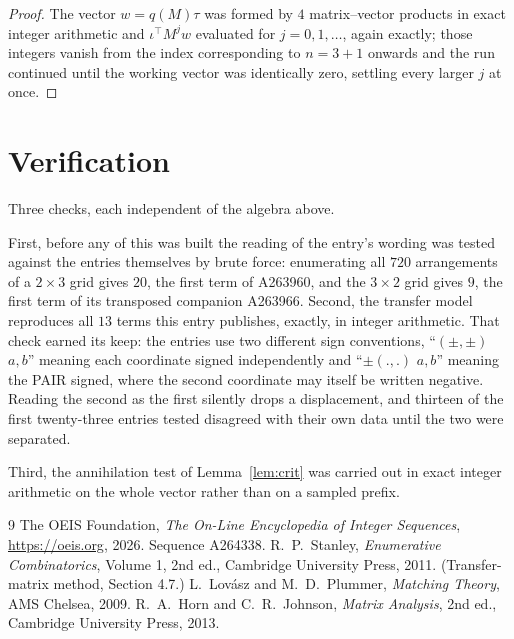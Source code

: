 \documentclass[11pt,a4paper]{article}
\theoremstyle{plain}
\theoremstyle{definition}
\begin{document}
\begin{proof}
The vector $w=q(M)\tau$ was formed by $4$ matrix--vector products in exact integer
arithmetic and $\iota^{\!\top}M^{j}w$ evaluated for $j=0,1,\dots$, again exactly; those
integers vanish from the index corresponding to $n=3+1$ onwards and the run continued
until the working vector was identically zero, settling every larger $j$ at once.
\end{proof}

\section{Verification}

Three checks, each independent of the algebra above.

First, before any of this was built the reading of the entry's wording was tested against the
entries themselves by brute force: enumerating all $720$ arrangements of a $2\times3$ grid
gives $20$, the first term of A263960, and the $3\times2$ grid gives $9$, the first term of its
transposed companion A263966. Second, the transfer model reproduces all $13$ terms this
entry publishes, exactly, in integer arithmetic. That check earned its keep: the entries use
two different sign conventions, ``$(\pm,\pm)$ $a,b$'' meaning each coordinate signed
independently and ``$\pm(.,.)$ $a,b$'' meaning the PAIR signed, where the second coordinate may
itself be written negative. Reading the second as the first silently drops a displacement, and
thirteen of the first twenty-three entries tested disagreed with their own data until the two
were separated.

Third, the annihilation test of Lemma~\ref{lem:crit} was carried out in exact integer
arithmetic on the whole vector rather than on a sampled prefix.

\begin{thebibliography}{9}
 The OEIS Foundation, \emph{The On-Line Encyclopedia of Integer
Sequences}, \url{https://oeis.org}, 2026. Sequence A264338.
 R.~P.~Stanley, \emph{Enumerative Combinatorics}, Volume 1, 2nd ed.,
Cambridge University Press, 2011. (Transfer-matrix method, Section 4.7.)
 L.~Lov\'asz and M.~D.~Plummer, \emph{Matching Theory}, AMS Chelsea, 2009.
 R.~A.~Horn and C.~R.~Johnson, \emph{Matrix Analysis}, 2nd ed., Cambridge
University Press, 2013.
\end{thebibliography}
\end{document}
